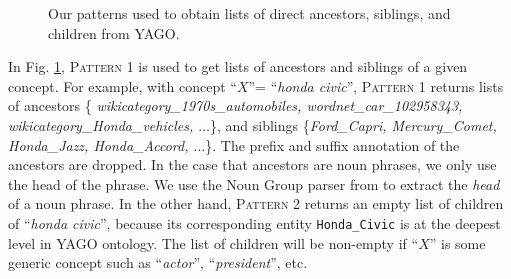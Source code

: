 \begin{figure}[!t]
  \begin{centering}
    {\scriptsize
    }
  \end{centering}
  \caption{Our patterns used to obtain lists of direct ancestors,
    siblings, and children from YAGO.}
    \label{alg:yago-query}
  \end{figure}

  In Fig. \ref{alg:yago-query}, \textsc{Pattern 1} is used to get
  lists of ancestors and siblings of a given concept. For example,
  with concept ``$X$''= ``{\em honda civic}'', \textsc{Pattern 1}
  returns lists of ancestors \linebreak[4] \{{\em
    wikicategory\_1970s\_automobiles, wordnet\_car\_102958343,
    \linebreak[4] wikicategory\_Honda\_vehicles, $\dots$}\}, and
  siblings \linebreak[4] \{{\em Ford\_Capri, Mercury\_Comet,
    Honda\_Jazz, Honda\_Accord, $\dots$}\}. The prefix and suffix annotation of the
  ancestors are dropped. In the case that ancestors are noun phrases,
  we only use the head of the phrase. We use the Noun Group parser
  from \cite{suchanek2007WWW} to extract the {\em head} of a noun
  phrase. In the other hand, \textsc{Pattern 2} returns an empty list
  of children of ``{\em honda civic}'', because its corresponding
  entity \texttt{Honda\_Civic} is at the deepest level in YAGO
  ontology. The list of children will be non-empty if ``$X$'' is some
  generic concept such as ``{\em actor}'', ``{\em president}'', etc.

